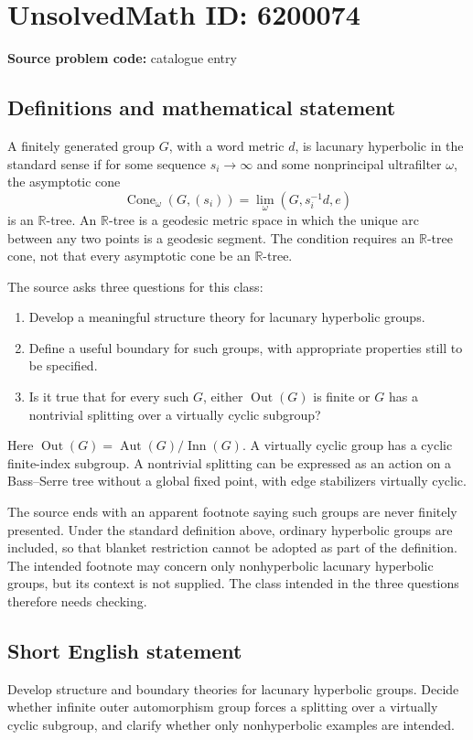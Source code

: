 \documentclass[11pt]{article}
\begin{document}
\section*{UnsolvedMath ID: 6200074}
\textbf{Source problem code:} catalogue entry
\subsection{Definitions and mathematical statement}
A finitely generated group $G$, with a word metric $d$, is lacunary hyperbolic in the standard sense if for some sequence $s_i\to\infty$ and some nonprincipal ultrafilter $\omega$, the asymptotic cone
\[
\operatorname{Cone}_\omega(G,(s_i))=\lim_\omega(G,s_i^{-1}d,e)
\]
is an $\mathbb R$-tree. An $\mathbb R$-tree is a geodesic metric space in which the unique arc between any two points is a geodesic segment. The condition requires an $\mathbb R$-tree cone, not that every asymptotic cone be an $\mathbb R$-tree.

The source asks three questions for this class:
\begin{enumerate}
\item Develop a meaningful structure theory for lacunary hyperbolic groups.
\item Define a useful boundary for such groups, with appropriate properties still to be specified.
\item Is it true that for every such $G$, either $\operatorname{Out}(G)$ is finite or $G$ has a nontrivial splitting over a virtually cyclic subgroup?
\end{enumerate}
Here $\operatorname{Out}(G)=\operatorname{Aut}(G)/\operatorname{Inn}(G)$. A virtually cyclic group has a cyclic finite-index subgroup. A nontrivial splitting can be expressed as an action on a Bass--Serre tree without a global fixed point, with edge stabilizers virtually cyclic.

The source ends with an apparent footnote saying such groups are never finitely presented. Under the standard definition above, ordinary hyperbolic groups are included, so that blanket restriction cannot be adopted as part of the definition. The intended footnote may concern only nonhyperbolic lacunary hyperbolic groups, but its context is not supplied. The class intended in the three questions therefore needs checking.
\subsection{Short English statement}
Develop structure and boundary theories for lacunary hyperbolic groups. Decide whether infinite outer automorphism group forces a splitting over a virtually cyclic subgroup, and clarify whether only nonhyperbolic examples are intended.
\end{document}
